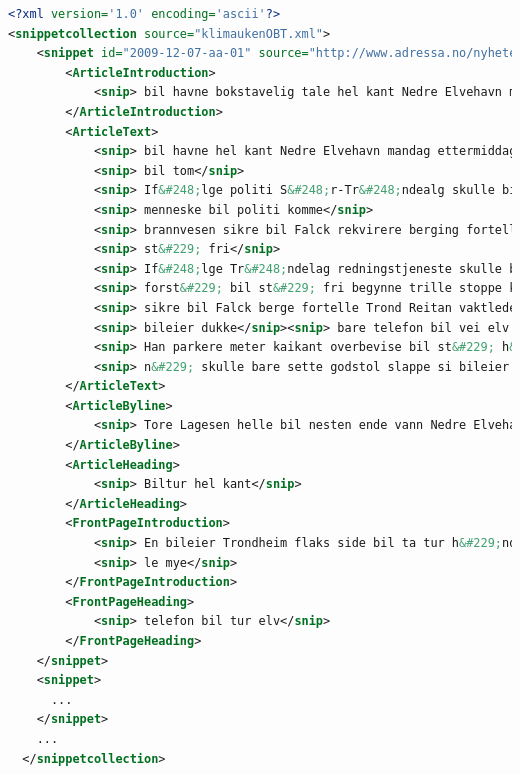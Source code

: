 \begin{lstlisting}[float=f, language=xml, breaklines=true, label=lst:snippetfile, caption={Snippet file encoded in XML}]
<?xml version='1.0' encoding='ascii'?>
<snippetcollection source="klimaukenOBT.xml">
    <snippet id="2009-12-07-aa-01" source="http://www.adressa.no/nyheter/trondheim/article1419658.ece" tags="Innenriks-ulykker-trafikk-utforkj&#248;ring-trondheim">
        <ArticleIntroduction>
            <snip> bil havne bokstavelig tale hel kant Nedre Elvehavn mandag ettermiddag</snip>
        </ArticleIntroduction>
        <ArticleText>
            <snip> bil havne hel kant Nedre Elvehavn mandag ettermiddag</snip>
            <snip> bil tom</snip>
            <snip> If&#248;lge politi S&#248;r-Tr&#248;ndealg skulle bil tom komme sted</snip>
            <snip> menneske bil politi komme</snip>
            <snip> brannvesen sikre bil Falck rekvirere berging fortelle Curt Ivar R&#248;hmen operasjonsleder S&#248;r-Tr&#248;ndelag politidistrikt</snip>
            <snip> st&#229; fri</snip>
            <snip> If&#248;lge Tr&#248;ndelag redningstjeneste skulle bil begynne rulle h&#229;nd</snip>
            <snip> forst&#229; bil st&#229; fri begynne trille stoppe kant</snip>
            <snip> sikre bil Falck berge fortelle Trond Reitan vaktleder 110-sentral</snip>
            <snip> bileier dukke</snip><snip> bare telefon bil vei elv si Tore Lagesen</snip>
            <snip> Han parkere meter kaikant overbevise bil st&#229; h&#229;ndbrekk</snip>
            <snip> n&#229; skulle bare sette godstol slappe si bileier hvilepuls</snip>
        </ArticleText>
        <ArticleByline>
            <snip> Tore Lagesen helle bil nesten ende vann Nedre Elvehavn</snip>
        </ArticleByline>
        <ArticleHeading>
            <snip> Biltur hel kant</snip>
        </ArticleHeading>
        <FrontPageIntroduction>
            <snip> En bileier Trondheim flaks side bil ta tur h&#229;nd mandag ettermiddag</snip>
            <snip> le mye</snip>
        </FrontPageIntroduction>
        <FrontPageHeading>
            <snip> telefon bil tur elv</snip>
        </FrontPageHeading>
    </snippet>
    <snippet>
      ...
    </snippet>
    ...
  </snippetcollection>
\end{lstlisting}

